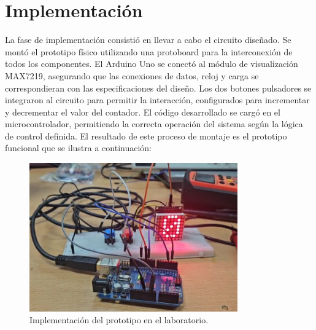 \section{Implementación}

La fase de implementación consistió en llevar a cabo el circuito diseñado. Se montó el prototipo físico utilizando una protoboard para la interconexión de todos los componentes. El Arduino Uno se conectó al módulo de visualización MAX7219, asegurando que las conexiones de datos, reloj y carga se correspondieran con las especificaciones del diseño. Los dos botones pulsadores se integraron al circuito para permitir la interacción, configurados para incrementar y decrementar el valor del contador. El código desarrollado se cargó en el microcontrolador, permitiendo la correcta operación del sistema según la lógica de control definida. El resultado de este proceso de montaje es el prototipo funcional que se ilustra a continuación:

\begin{figure}[H]
\centering
 \includegraphics[width=0.8\textwidth]{Diagramas/implemen.jpg}
\caption{Implementación del prototipo en el laboratorio.}
\label{fig:implementacion_laboratorio}
\end{figure}
